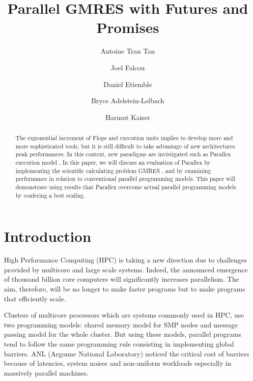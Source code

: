 \documentclass{llncs}
\begin{document}
\title{Parallel GMRES with Futures and Promises}

\author{Antoine Tran Tan \and Joel Falcou \and
Daniel Etiemble \and Bryce Adelstein-Lelbach \and Harmut Kaiser}

\maketitle

\begin{abstract}
The exponential increment of Flops and execution units implies to develop more and more sophisticated tools, but it is still difficult to take advantage of new architectures peak performances. In this context, new paradigms are invistigated such as Parallex execution model \cite{Parallex}. In this paper, we will discuss an evaluation of Parallex by implementing the scientific calculating problem GMRES \cite{GMRES}, and by examining performance in relation to conventional parallel programming models. This paper will demonstrate using results that Parallex overcome actual parallel programming models by confering a best scaling.
\end{abstract}


\section{Introduction}\label{Introduction}
High Performance Computing (HPC) is taking a new direction due to challenges provided by multicore and large scale systems. Indeed, the announced emergence of thousand billion core computers will significantly increases parallelism. The aim, therefore, will be no longer to make faster programs but to make programs that efficiently scale.\smallskip 

Clusters of multicore processors which are systems commonly used in HPC, use two programming models: shared memory model for SMP nodes and message passing model for the whole cluster. But using these models, parallel programs tend to follow the same programming rule consisting in implementing global barriers. ANL (Argonne National Laboratory) noticed the critical cost of barriers because of latencies, system noises and non-uniform workloads especially in massively parallel machines.\smallskip 
\end{document}
